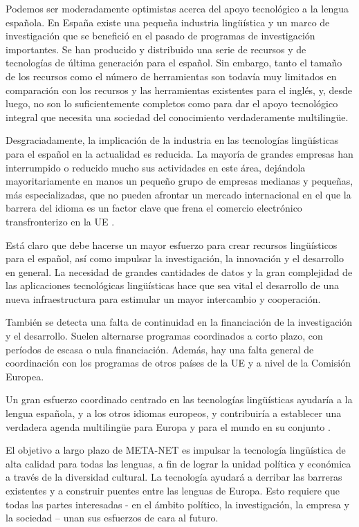 \begin{multicols}{2}
Podemos ser moderadamente optimistas acerca del apoyo tecnológico a la lengua española. En España existe una pequeña industria lingüística y un marco de investigación que se benefició en el pasado de programas de investigación importantes. Se han producido y distribuido una serie de recursos y de tecnologías de última generación para el español. Sin embargo, tanto el tamaño de los recursos como el número de herramientas son todavía muy limitados en comparación con los recursos y las herramientas existentes para el inglés, y, desde luego, no son lo suficientemente completos como para dar el apoyo tecnológico integral que necesita una sociedad del conocimiento verdaderamente multilingüe.

Desgraciadamente, la implicación de la industria en las tecnologías lingüísticas para el español en la actualidad es reducida. La mayoría de grandes empresas han interrumpido o reducido mucho sus actividades en este área, dejándola mayoritariamente en manos un pequeño grupo de empresas medianas y pequeñas, más especializadas, que no pueden afrontar un mercado internacional en el que la barrera del idioma es un factor clave que frena el comercio electrónico transfronterizo en la UE \cite{EUecommerce}.

Está claro que debe hacerse un mayor esfuerzo para crear recursos lingüísticos para el español, así como impulsar la investigación, la innovación y el desarrollo en general. La necesidad de grandes cantidades de datos y la gran complejidad de las aplicaciones tecnológicas lingüísticas hace que sea vital el desarrollo de una nueva infraestructura para estimular un mayor intercambio y cooperación.

También se detecta una falta de continuidad en la financiación de la investigación y el desarrollo. Suelen alternarse programas coordinados a corto plazo, con períodos de escasa o nula financiación. Además, hay una falta general de coordinación con los programas de otros países de la UE y a nivel de la Comisión Europea.

Un gran esfuerzo coordinado centrado en las tecnologías lingüísticas ayudaría a la lengua española, y a los otros idiomas europeos, y contribuiría a establecer una verdadera agenda multilingüe para Europa y para el mundo en su conjunto \cite{HuLaTec}. 

El objetivo a largo plazo de META-NET es impulsar la tecnología lingüística de alta calidad para todas las lenguas, a fin de lograr la unidad política y económica a través de la diversidad cultural. La tecnología ayudará a derribar las barreras existentes y a construir puentes entre las lenguas de Europa. Esto requiere que todas las partes interesadas - en el ámbito político, la investigación, la empresa y la sociedad -- unan sus esfuerzos de cara al futuro. 
\end{multicols}

